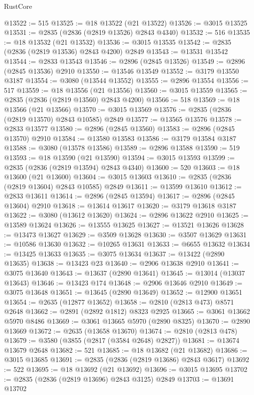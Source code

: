 \begin{lexlean}{RustCore}
\begin{coremodule}
@13522 := 515
@13525 := @18 @13522 (@21 @13522)
@13526 := @3015 @13525
@13531 := @2835 (@2836 (@2819 @13526) @2843 @4340)
@13532 := 516
@13535 := @18 @13532 (@21 @13532)
@13536 := @3015 @13535
@13542 := @2835 (@2836 (@2819 @13536) @2843 @4200) @2849
@13543 := @13531 @13542
@13544 := @2833 @13543
@13546 := @2896 (@2845 @13526)
@13549 := @2896 (@2845 @13536) @2910
@13550 := @13546 @13549
@13552 := @3179 @13550 @3187
@13554 := @3080 (@13544 @13552)
@13555 := @2896 @13554
@13556 := 517
@13559 := @18 @13556 (@21 @13556)
@13560 := @3015 @13559
@13565 := @2835 (@2836 (@2819 @13560) @2843 @4200)
@13566 := 518
@13569 := @18 @13566 (@21 @13566)
@13570 := @3015 @13569
@13576 := @2835 (@2836 (@2819 @13570) @2843 @10585) @2849
@13577 := @13565 @13576
@13578 := @2833 @13577
@13580 := @2896 (@2845 @13560)
@13583 := @2896 (@2845 @13570) @2910
@13584 := @13580 @13583
@13586 := @3179 @13584 @3187
@13588 := @3080 (@13578 @13586)
@13589 := @2896 @13588
@13590 := 519
@13593 := @18 @13590 (@21 @13590)
@13594 := @3015 @13593
@13599 := @2835 (@2836 (@2819 @13594) @2843 @4340)
@13600 := 520
@13603 := @18 @13600 (@21 @13600)
@13604 := @3015 @13603
@13610 := @2835 (@2836 (@2819 @13604) @2843 @10585) @2849
@13611 := @13599 @13610
@13612 := @2833 @13611
@13614 := @2896 (@2845 @13594)
@13617 := @2896 (@2845 @13604) @2910
@13618 := @13614 @13617
@13620 := @3179 @13618 @3187
@13622 := @3080 (@13612 @13620)
@13624 := @2896 @13622 @2910
@13625 := @13589 @13624
@13626 := @13555 @13625
@13627 := @13521 @13626
@13628 := @13473 @13627
@13629 := @3509 @13628
@13630 := @3507 @13629
@13631 := @10586 @13630
@13632 := @10265 @13631
@13633 := @6655 @13632
@13634 := @13425 @13633
@13635 := @3075 @13634
@13637 := @13422 (@2890 @13635)
@13638 := @13423 @23
@13640 := @2906 @13638 @2910
@13641 := @3075 @13640
@13643 := @13637 (@2890 @13641)
@13645 := @13014 (@13037 @13643)
@13646 := @13423 @174
@13648 := @2906 @13646 @2910
@13649 := @3075 @13648
@13651 := @13645 (@2890 @13649)
@13652 := @12900 @13651
@13654 := @2635 (@12877 @13652)
@13658 := @2810 (@2813 @473) @8571 @2648
@13662 := @2891 (@2892 @1812) @8323 @2925
@13665 := @3061 @13662 @5970 @8486
@13669 := @3061 @13665 @5970 (@2890 @8325)
@13670 := @2890 @13669
@13672 := @2635 (@13658 @13670)
@13674 := @2810 (@2813 @478)
@13679 := @3580 (@3855 (@2817 (@3584 @2648) @2827))
@13681 := @13674 @13679 @2648
@13682 := 521
@13685 := @18 @13682 (@21 @13682)
@13686 := @3015 @13685
@13691 := @2835 (@2836 (@2819 @13686) @2843 @3617)
@13692 := 522
@13695 := @18 @13692 (@21 @13692)
@13696 := @3015 @13695
@13702 := @2835 (@2836 (@2819 @13696) @2843 @3125) @2849
@13703 := @13691 @13702

\end{coremodule}
\end{lexlean}
